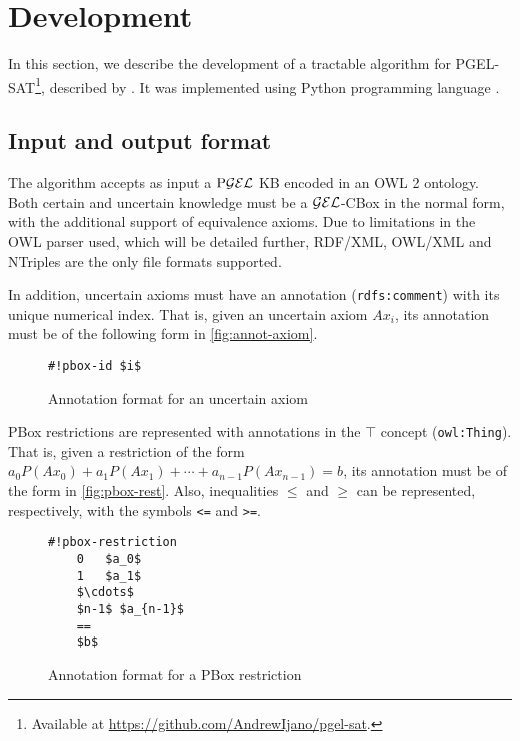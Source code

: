 
\chapter{Development}
\label{cap:development}

In this section, we describe the development of a tractable algorithm for PGEL-SAT\footnote{Available at \url{https://github.com/AndrewIjano/pgel-sat}.}, described by \citet{Fin2020}. It was implemented using Python programming language \citep{python3}.

\section{Input and output format}

The algorithm accepts as input a $\text{P}\mathcal{GEL}$ KB encoded in an OWL 2 ontology. Both certain and uncertain knowledge must be a $\mathcal{GEL}$-CBox in the normal form, with the additional support of equivalence axioms. Due to limitations in the OWL parser used, which will be detailed further, RDF/XML, OWL/XML and NTriples are the only file formats supported.

In addition, uncertain axioms must have an annotation (\texttt{rdfs:comment}) with its unique numerical index. That is, given an uncertain axiom $Ax_i$, its annotation must be of the following form in \autoref{fig:annot-axiom}.
\begin{figure}
	\centering
	\begin{minipage}{6cm}
		\begin{lstlisting}[style=mystyle]
      #!pbox-id $i$
    \end{lstlisting}
	\end{minipage}
	\caption{Annotation format for an uncertain axiom}
	\label{fig:annot-axiom}
\end{figure}

PBox restrictions are represented with annotations in the $\top$ concept (\texttt{owl:Thing}). That is, given a restriction of the form $a_0 P(Ax_0) + a_1P(Ax_1) + \cdots + a_{n-1} P(Ax_{n-1}) = b$, its annotation must be of the form in \autoref{fig:pbox-rest}.  Also, inequalities $\leq$ and $\geq$ can be represented, respectively, with the symbols \texttt{<=} and \texttt{>=}.

\begin{figure}
	\centering
	\begin{minipage}{6cm}
		\begin{lstlisting}[style=mystyle]
    #!pbox-restriction
    0   $a_0$
    1   $a_1$
    $\cdots$
    $n-1$ $a_{n-1}$
    ==
    $b$
    \end{lstlisting}
	\end{minipage}
	\caption{Annotation format for a PBox restriction}
	\label{fig:pbox-rest}
\end{figure}


